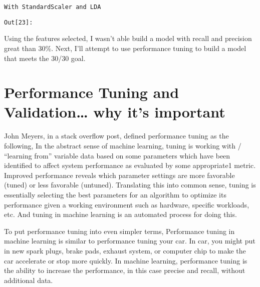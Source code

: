\documentclass{article}
\begin{document}
    \begin{Verbatim}[commandchars=\\\{\}]
With StandardScaler and LDA
    \end{Verbatim}
\texttt{\color{outcolor}Out[{\color{outcolor}23}]:}
    

    

    Using the features selected, I wasn't able build a model with recall and
precision great than 30\%. Next, I'll attempt to use performance tuning
to build a model that meets the 30/30 goal.

    \section{Performance Tuning and Validation\ldots{} why it's
important}\label{performance-tuning-and-validation-why-its-important}

    John Meyers, in a stack overflow post, defined performance tuning as the
following, In the abstract sense of machine learning, tuning is working
with / ``learning from'' variable data based on some parameters which
have been identified to affect system performance as evaluated by some
appropriate1 metric. Improved performance reveals which parameter
settings are more favorable (tuned) or less favorable (untuned).
Translating this into common sense, tuning is essentially selecting the
best parameters for an algorithm to optimize its performance given a
working environment such as hardware, specific workloads, etc. And
tuning in machine learning is an automated process for doing this.

To put performance tuning into even simpler terms, Performance tuning in
machine learning is similar to performance tuning your car. In car, you
might put in new spark plugs, brake pads, exhaust system, or computer
chip to make the car accelerate or stop more quickly. In machine
learning, performance tuning is the ability to increase the performance,
in this case precise and recall, without additional data.
\end{document}
